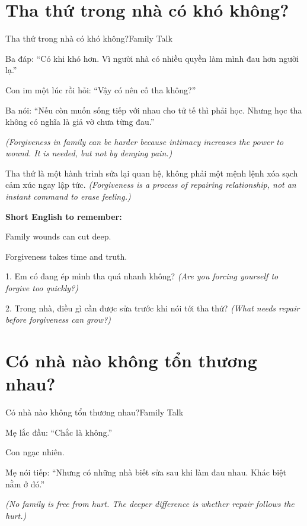 \section{Tha thứ trong nhà có khó không?}
\begin{truyen}{Tha thứ trong nhà có khó không?}{Family Talk}

Ba đáp: ``Có khi khó hơn. Vì người nhà có nhiều quyền làm mình đau hơn người lạ.''

Con im một lúc rồi hỏi: ``Vậy có nên cố tha không?''

Ba nói: ``Nếu còn muốn sống tiếp với nhau cho tử tế thì phải học. Nhưng học tha không có nghĩa là giả vờ chưa từng đau.''

\textit{(Forgiveness in family can be harder because intimacy increases the power to wound. It is needed, but not by denying pain.)}
\end{truyen}

\begin{baihoc}
Tha thứ là một hành trình sửa lại quan hệ, không phải một mệnh lệnh xóa sạch cảm xúc ngay lập tức.
\textit{(Forgiveness is a process of repairing relationship, not an instant command to erase feeling.)}
\end{baihoc}

\begin{ghinhoanh}
\textbf{Short English to remember:}

Family wounds can cut deep.

Forgiveness takes time and truth.
\end{ghinhoanh}

\begin{tuhocnhanh}
1. Em có đang ép mình tha quá nhanh không? \textit{(Are you forcing yourself to forgive too quickly?)}

2. Trong nhà, điều gì cần được sửa trước khi nói tới tha thứ? \textit{(What needs repair before forgiveness can grow?)}
\end{tuhocnhanh}
\ngancach

\section{Có nhà nào không tổn thương nhau?}
\begin{truyen}{Có nhà nào không tổn thương nhau?}{Family Talk}

Mẹ lắc đầu: ``Chắc là không.''

Con ngạc nhiên.

Mẹ nói tiếp: ``Nhưng có những nhà biết sửa sau khi làm đau nhau. Khác biệt nằm ở đó.''

\textit{(No family is free from hurt. The deeper difference is whether repair follows the hurt.)}
\end{truyen}

